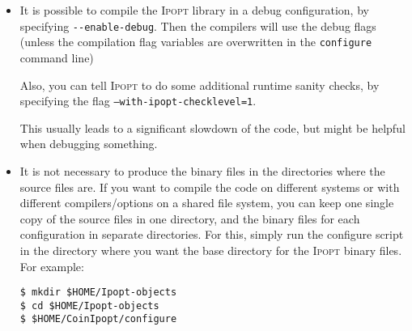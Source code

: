 \documentclass[10pt]{article}
\newcommand{\Ipopt}{\textsc{Ipopt}\xspace}
\begin{document}
\begin{itemize}

\item It is possible to compile the \Ipopt library in a debug
  configuration, by specifying \verb|--enable-debug|.  Then the
  compilers will use the debug flags (unless the compilation flag
  variables are overwritten in the {\tt configure} command line)

  Also, you can tell \Ipopt to do some additional runtime sanity
  checks, by specifying the flag {\tt --with-ipopt-checklevel=1}.

  This usually leads to a significant slowdown of the code, but might
  be helpful when debugging something.

\item It is not necessary to produce the binary files in the
  directories where the source files are.  If you want to compile the
  code on different systems or with different compilers/options on a
  shared file system, you can keep one single copy of the source files
  in one directory, and the binary files for each configuration in
  separate directories.  For this, simply run the configure script in
  the directory where you want the base directory for the \Ipopt
  binary files.  For example:

  {\tt \$ mkdir \$HOME/Ipopt-objects}\\
  {\tt \$ cd \$HOME/Ipopt-objects}\\
  {\tt \$ \$HOME/CoinIpopt/configure}

\end{itemize}

%
%

\end{document}
